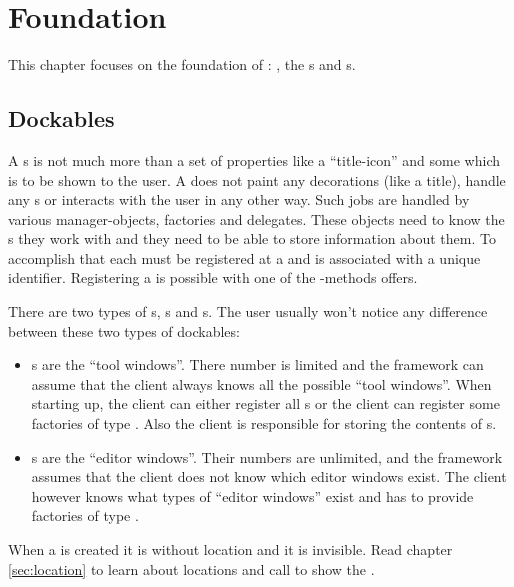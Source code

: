 \section{Foundation}
This chapter focuses on the foundation of : , the s and s.

\subsection{Dockables}
A s is not much more than a set of properties like a ``title-icon'' and some  which is to be shown to the user. A  does not paint any decorations (like a title), handle any s or interacts with the user in any other way. Such jobs are handled by various manager-objects, factories and delegates. These objects need to know the s they work with and they need to be able to store information about them. To accomplish that each  must be registered at a  and is associated with a unique identifier. Registering a  is possible with one of the -methods  offers.

There are two types of s, s and \linebreak {}s. The user usually won't notice any difference between these two types of dockables:
\begin{itemize}
 \item {}s are the ``tool windows''. There number is limited and the framework can assume that the client always knows all the possible ``tool windows''. When starting up, the client can either register all s or the client can register some factories of type  . Also the client is responsible for storing the contents of s.
 \item {}s are the ``editor windows''. Their numbers are unlimited, and the framework assumes that the client does not know which editor windows exist. The client however knows what types of ``editor windows'' exist and has to provide factories of type .
\end{itemize}

When a  is created it is without location and it is invisible. Read chapter \ref{sec:location} to learn about locations and call  to show the .


